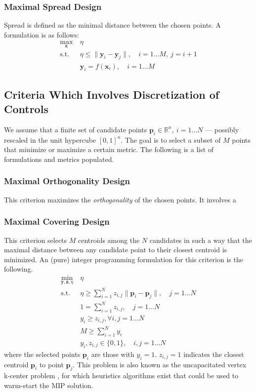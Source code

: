 \documentclass{article}
\begin{document}
	\subsubsection{Maximal Spread Design}
	Spread is defined as the minimal distance between the chosen points. A formulation is as follows:
	\begin{align}
		\max_{\mathbf{x}} \	& \eta  \\
		\text{s.t. } 		& \eta \leq \lVert \boldsymbol{y}_i - \boldsymbol{y}_j \rVert, \quad i = 1 \dots M, \ j=i+1 \\
							& \boldsymbol{y}_i = f(\boldsymbol{x}_i), \quad i = 1 \dots M
	\end{align}
	
	\subsection{Criteria Which Involves Discretization of Controls}
	We assume that a finite set of candidate points $\mathbf{p}_i\in \mathbb{R}^{n}, \ i=1 \dots N$ --- possibly rescaled in the unit hypercube $[0, 1]^n$. The goal is to select a subset of $M$ points that minimize or maximize a certain metric. The following is a list of formulations and metrics populated.
	
	\subsubsection{Maximal Orthogonality Design}
	This criterion maximizes the \emph{orthogonality} of the chosen points. It involves a
	
	\subsubsection{Maximal Covering Design}
	This criterion selects $M$ centroids among the $N$ candidates in such a way that the maximal distance between any candidate point to their closest centroid is minimized. An (pure) integer programming formulation for this criterion is the following.
	\begin{align}
		\min_{\mathbf{y}, \mathbf{z}, \eta} \ & \eta  \\
		\text{s.t. } & \eta \geq \sum_{i=1}^N z_{i,j} \lVert \mathbf{p}_i - \mathbf{p}_j \rVert, \quad j = 1 \dots N  \\
					 & 1 = \sum_{i=1}^{N} z_{i,j}, \quad j = 1\dots N  \\
					 & y_i \geq z_{i,j}, \forall i,j = 1 \dots N  \\
					 & M \geq \sum_{i=1}^{N} y_i  \\
					 & y_i, z_{i,j} \in \{0, 1\}, \quad i,j = 1 \dots N
	\end{align}
	where the selected points $\mathbf{p}_i$ are those with $y_i = 1$. $z_{i,j} = 1$ indicates the closest centroid $\mathbf{p}_i$ to point $\mathbf{p}_j$. This problem is also known as the uncapacitated vertex k-center problem \citep{Cornejo2020Solving}, for which heuristics algorithms exist that could be used to warm-start the MIP solution.
\end{document}
